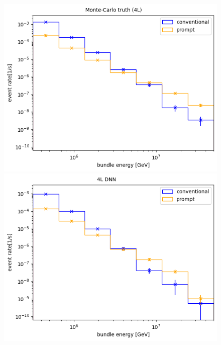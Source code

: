 \documentclass[
  tucolor,       %
  BCOR=12mm,     %
  parskip=half,  %
  open=any,      %
  cleardoublepage=plain,  %
]{tudothesis}
\begin{document}
\begin{figure}
  \centering
  \begin{minipage}[t]{0.49\textwidth}
    \includegraphics[width=\textwidth]{Plots/muon flux monte carlo bundle 4L cut}
  \end{minipage}
  \begin{minipage}[t]{0.49\textwidth}
    \includegraphics[width=\textwidth]{Plots/muon flux small dnn bundle cut}
  \end{minipage}
  \begin{minipage}[t]{0.49\textwidth}

\end{minipage}
\end{figure}
\end{document}

